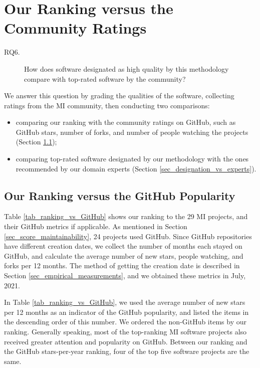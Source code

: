 \section{Our Ranking versus the Community Ratings}
\label{sec_rq_comparison}
\begin{description}
\item[RQ6.] How does software designated as high quality by this methodology compare with top-rated software by the community?
\end{description}

We answer this question by grading the qualities of the software, collecting ratings from the MI community, then conducting two comparisons:
\begin{itemize}
\item comparing our ranking with the community ratings on GitHub, such as GitHub stars, number of forks, and number of people watching the projects (Section \ref{sec_ranking_vs_github});
\item comparing top-rated software designated by our methodology with the ones recommended by our domain experts (Section \ref{sec_designation_vs_experts}).
\end{itemize}

\subsection{Our Ranking versus the GitHub Popularity}
\label{sec_ranking_vs_github}

Table \ref{tab_ranking_vs_GitHub} shows our ranking to the 29 MI projects, and their GitHub metrics if applicable. As mentioned in Section \ref{sec_score_maintainability}, 24 projects used GitHub. Since GitHub repositories have different creation dates, we collect the number of months each stayed on GitHub, and calculate the average number of new stars, people watching, and forks per 12 months. The method of getting the creation date is described in Section \ref{sec_empirical_measurements}, and we obtained these metrics in July, 2021.

In Table \ref{tab_ranking_vs_GitHub}, we used the average number of new stars per 12 months as an indicator of the GitHub popularity, and listed the items in the descending order of this number. We ordered the non-GitHub items by our ranking. Generally speaking, most of the top-ranking MI software projects also received greater attention and popularity on GitHub. Between our ranking and the GitHub stars-per-year ranking, four of the top five software projects are the same.

